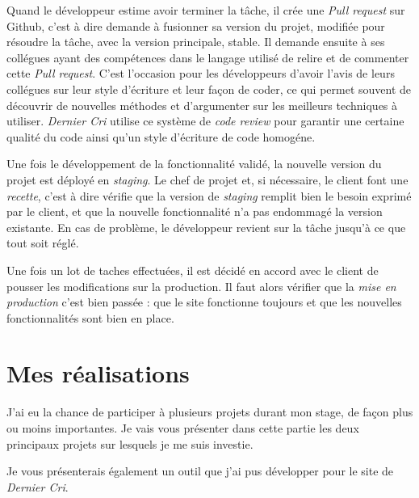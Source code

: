 \bigskip

Quand le développeur estime avoir terminer la tâche, il crée une
\emph{Pull request} sur Github, c'est à dire demande à fusionner sa
version du projet, modifiée pour résoudre la tâche, avec la version
principale, stable. Il demande ensuite à ses collégues ayant des
compétences dans le langage utilisé de relire et de commenter cette
\emph{Pull request}. C'est l'occasion pour les développeurs d'avoir
l'avis de leurs collégues sur leur style d'écriture et leur façon de
coder, ce qui permet souvent de découvrir de nouvelles méthodes et
d'argumenter sur les meilleurs techniques à utiliser. \emph{Dernier Cri}
utilise ce système de \emph{code review} pour garantir une certaine
qualité du code ainsi qu'un style d'écriture de code homogéne.

\bigskip

Une fois le développement de la fonctionnalité validé, la nouvelle
version du projet est déployé en \emph{staging}. Le chef de projet et,
si nécessaire, le client font une \emph{recette}, c'est à dire vérifie
que la version de \emph{staging} remplit bien le besoin exprimé par le
client, et que la nouvelle fonctionnalité n'a pas endommagé la version
existante. En cas de problème, le développeur revient sur la tâche
jusqu'à ce que tout soit réglé.

\bigskip

Une fois un lot de taches effectuées, il est décidé en accord avec le
client de pousser les modifications sur la production. Il faut alors
vérifier que la \emph{mise en production} c'est bien passée : que le
site fonctionne toujours et que les nouvelles fonctionnalités sont bien
en place.

\newpage

\section{Mes réalisations}\label{mes-ruxe9alisations}

\bigskip

J'ai eu la chance de participer à plusieurs projets durant mon stage, de
façon plus ou moins importantes. Je vais vous présenter dans cette
partie les deux principaux projets sur lesquels je me suis investie.

\bigskip

Je vous présenterais également un outil que j'ai pus développer pour le
site de \emph{Dernier Cri}.

\bigskip

